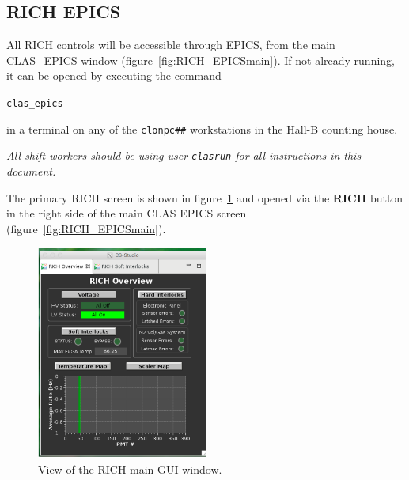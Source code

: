 \documentclass[12pt]{article}
\begin{document}
{
 \twocolumn
\subsection{RICH EPICS}
}
All RICH controls will be  accessible through EPICS, from the main CLAS\_EPICS window (figure~\ref{fig:RICH_EPICSmain}).  If not already running, it can be opened by executing
the command 
\begin{center}
\texttt{clas\_epics}
\end{center}
 in a terminal on any of the \texttt{clonpc\#\#} workstations in the Hall-B counting house.

{\em   All shift workers should be using user \texttt{clasrun} for all instructions in this document.}

The primary RICH screen is shown in figure~\ref{fig:RICH_GUI} and opened via the {\bf RICH} button in the right side of the main CLAS EPICS 
screen (figure~\ref{fig:RICH_EPICSmain}).



\begin{figure}[h!]
\includegraphics[width=0.50\textwidth]{pics/RICH_main_GUI.png}
\caption{ \label{fig:RICH_GUI} View of the RICH main GUI window.}
\end{figure}
\end{document}
